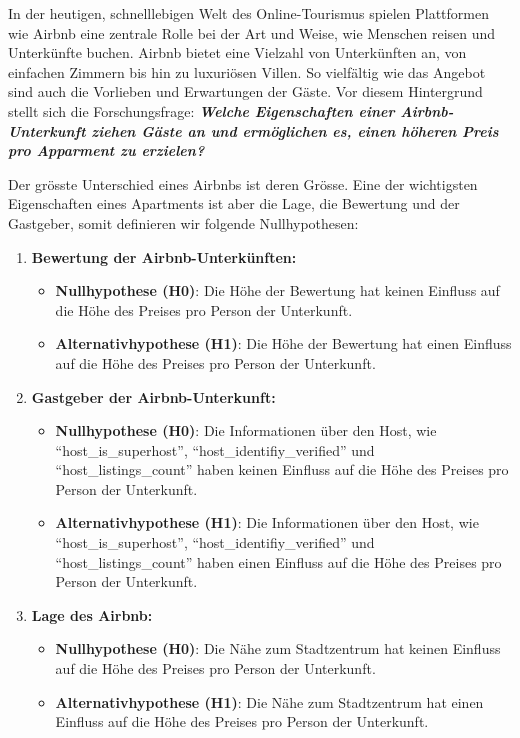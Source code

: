 \documentclass[
  journal,
]{IEEEtran}%
\begin{document}
In der heutigen, schnelllebigen Welt des Online-Tourismus spielen
Plattformen wie Airbnb eine zentrale Rolle bei der Art und Weise, wie
Menschen reisen und Unterkünfte buchen. Airbnb bietet eine Vielzahl von
Unterkünften an, von einfachen Zimmern bis hin zu luxuriösen Villen. So
vielfältig wie das Angebot sind auch die Vorlieben und Erwartungen der
Gäste. Vor diesem Hintergrund stellt sich die Forschungsfrage:
\textbf{\emph{Welche Eigenschaften einer Airbnb-Unterkunft ziehen Gäste
an und ermöglichen es, einen höheren Preis pro Apparment zu erzielen?}}

Der grösste Unterschied eines Airbnbs ist deren Grösse. Eine der
wichtigsten Eigenschaften eines Apartments ist aber die Lage, die
Bewertung und der Gastgeber, somit definieren wir folgende
Nullhypothesen:

\begin{enumerate}
\def\labelenumi{\arabic{enumi}.}
\item
  \textbf{Bewertung der Airbnb-Unterkünften:}

  \begin{itemize}
  \item
    \textbf{Nullhypothese (H0)}: Die Höhe der Bewertung hat keinen
    Einfluss auf die Höhe des Preises pro Person der Unterkunft.
  \item
    \textbf{Alternativhypothese (H1)}: Die Höhe der Bewertung hat einen
    Einfluss auf die Höhe des Preises pro Person der Unterkunft.
  \end{itemize}
\item
  \textbf{Gastgeber der Airbnb-Unterkunft:}

  \begin{itemize}
  \item
    \textbf{Nullhypothese (H0)}: Die Informationen über den Host, wie
    ``host\_is\_superhost'', ``host\_identifiy\_verified'' und
    ``host\_listings\_count'' haben keinen Einfluss auf die Höhe des
    Preises pro Person der Unterkunft.
  \item
    \textbf{Alternativhypothese (H1)}: Die Informationen über den Host,
    wie ``host\_is\_superhost'', ``host\_identifiy\_verified'' und
    ``host\_listings\_count'' haben einen Einfluss auf die Höhe des
    Preises pro Person der Unterkunft.
  \end{itemize}
\item
  \textbf{Lage des Airbnb:}

  \begin{itemize}
  \item
    \textbf{Nullhypothese (H0)}: Die Nähe zum Stadtzentrum hat keinen
    Einfluss auf die Höhe des Preises pro Person der Unterkunft.
  \item
    \textbf{Alternativhypothese (H1)}: Die Nähe zum Stadtzentrum hat
    einen Einfluss auf die Höhe des Preises pro Person der Unterkunft.
  \end{itemize}
\end{enumerate}
\end{document}
